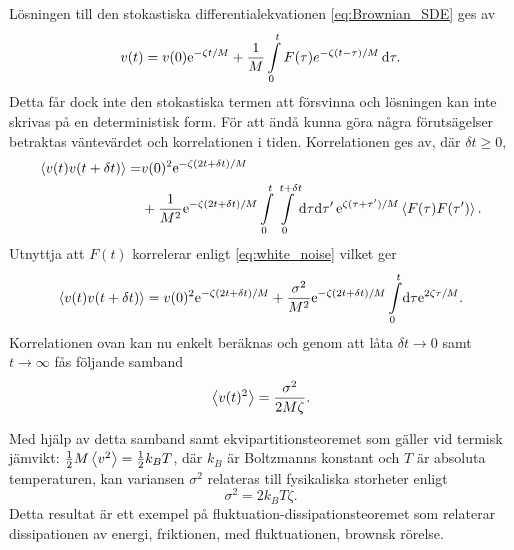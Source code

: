 Lösningen till den stokastiska differentialekvationen
\eqref{eq:Brownian_SDE} ges av  
\begin{equation}
v(t)
=v(0)\ee^{-\zeta t/M}
 +\frac{1}{M}\int^t_0 F(\tau)e^{-\zeta (t-\tau)/M} \id\tau.
\end{equation}
Detta får dock inte den stokastiska termen att försvinna och lösningen kan inte skrivas på en deterministisk form. För att ändå kunna göra några förutsägelser betraktas väntevärdet och korrelationen i tiden. Korrelationen ges av, där $\delta t\geq0$,
\begin{equation}\label{Brownian_korr}
\begin{aligned}
\ev{v(t)v(t+\delta t)} 
=& v(0)^2\ee^{-\zeta(2t+\delta t)/M}\\
 &+ \frac{1}{M^2}\ee^{-\zeta (2t+\delta t)/M}
  \int_0^t\int_0^{t+\delta t}\!\dd\tau\dd\tau'\, 
     \ee^{\zeta (\tau+\tau')/M}\ev{F(\tau)F(\tau')}.
\end{aligned}
\end{equation}
Utnyttja att $F(t)$ korrelerar enligt \eqref{eq:white_noise} vilket ger 
\begin{equation} \label{eq:Brown_korr}
\ev{v(t)v(t+\delta t)} 
= v(0)^2\ee^{-\zeta (2t+\delta t)/M}
 +\frac{\sigma^2}{M^2}\ee^{-\zeta (2t+\delta t)/M}
  \int_0^t\!\dd\tau\ee^{2\zeta \tau /M}.
\end{equation}
Korrelationen ovan kan nu enkelt beräknas och genom att låta $\delta t\to 0$ samt $t\to \infty$ fås följande samband
\begin{equation}
    \ev{v(t)^2} = \frac{\sigma^2}{2M\zeta}.
\end{equation}

Med hjälp av detta samband samt ekvipartitionsteoremet som gäller vid termisk jämvikt: $\frac{1}{2}M\ev{v^2}=\frac{1}{2}k_BT$, där $k_B$ är Boltzmanns konstant och $T$ är absoluta temperaturen, kan variansen $\sigma^2$ relateras till fysikaliska storheter enligt
\begin{equation}
    \sigma^2 = 2k_BT\zeta.
\end{equation}
Detta resultat är ett exempel på fluktuation-dissipationsteoremet som relaterar dissipationen av energi, friktionen, med fluktuationen, brownsk rörelse. 

